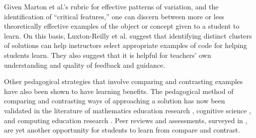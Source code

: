 
Given Marton et al.'s rubric for effective patterns of variation, and the identification of ``critical features,'' one can discern between more or less theoretically effective examples of the object or concept given to a student to learn. On this basis, Luxton-Reilly et al. \cite{Luxton13} suggest that identifying distinct clusters of solutions can help instructors select appropriate examples of code for helping students learn. They also suggest that it is helpful for teachers' own understanding and quality of feedback and guidance. 

Other pedagogical strategies that involve comparing and contrasting examples have also been shown to have learning benefits. The pedagogical method of comparing and contrasting ways of approaching a solution has now been validated in the literature of mathematics education research \cite{Star07}, cognitive science \cite{loewenstein2003analogical,kurtz01learning,telling}, and computing education research \cite{Suhonen08, PatitsasICER13}. Peer reviews and assessments, surveyed in \cite{peerReview98}, are yet another opportunity for students to learn from compare and contrast.



